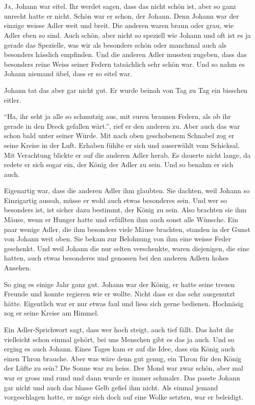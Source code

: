 \chapter*{}
\lettrine[lines=3]{\color{red}J}{a}, Johann war eitel. Ihr werdet sagen, dass das nicht schön ist, aber so ganz unrecht hatte er nicht. Schön war er schon, der Johann. Denn Johann war der einzige weisse Adler weit und breit. Die anderen waren braun oder grau, wie Adler eben so sind. Auch schön, aber nicht so speziell wie Johann und oft ist es ja gerade das Spezielle, was wir als besonders schön oder manchmal auch als besonders hässlich empfinden. Und die anderen Adler mussten zugeben, dass das besonders reine Weiss seiner Federn tatsächlich sehr schön war. Und so nahm es Johann niemand übel, dass er so eitel war. 

Johann tat das aber gar nicht gut. Er wurde beinah von Tag zu Tag ein bisschen eitler. 

\enquote{Ha, ihr seht ja alle so schmutzig aus, mit euren braunen Federn, als ob ihr gerade in den Dreck gefallen wärt.}, rief er den anderen zu. Aber auch das war schon bald unter seiner Würde. Mit nach oben geschobenem Schnabel zog er seine Kreise in der Luft. Erhaben fühlte er sich und auserwählt vom Schicksal. Mit Verachtung blickte er auf die anderen Adler herab. Es dauerte nicht lange, da redete er sich sogar ein, der König der Adler zu sein. Und so benahm er sich auch.

Eigenartig war, dass die anderen Adler ihm glaubten. Sie dachten, weil Johann so Einzigartig aussah, müsse er wohl auch etwas besonderes sein. Und wer so besonders ist, ist sicher dazu bestimmt, der König zu sein. Also brachten sie ihm Mäuse, wenn er Hunger hatte und erfüllten ihm auch sonst alle Wünsche. Ein paar wenige Adler, die ihm besonders viele Mäuse brachten, standen in der Gunst von Johann weit oben. Sie bekam zur Belohnung von ihm eine weisse Feder geschenkt. Und weil Johann die nur selten verschenkte, waren diejenigen, die eine hatten, auch etwas besonderes und genossen bei den anderen Adlern hohes Ansehen. 

So ging es einige Jahr ganz gut. Johann war der König, er hatte seine treuen Freunde und konnte regieren wie er wollte. Nicht dass er das sehr ausgenutzt hätte. Eigentlich war er nur etwas faul und liess sich gerne bedienen. Hochnäsig zog er seine Kreise am Himmel.

Ein Adler-Sprichwort sagt, dass wer hoch steigt, auch tief fällt. Das habt ihr vielleicht schon einmal gehört, bei uns Menschen gibt es das ja auch. Und so erging es auch Johann. Eines Tages kam er auf die Idee, dass ein König auch einen Thron brauche. Aber was wäre denn gut genug, ein Thron für den König der Lüfte zu sein? Die Sonne war zu heiss. Der Mond war zwar schön, aber mal war er gross und rund und dann wurde er immer schmaler. Das passte Johann gar nicht und auch das blasse Gelb gefiel ihm nicht. Als einmal jemand vorgeschlagen hatte, er möge sich doch auf eine Wolke setzten, war er beleidigt.


